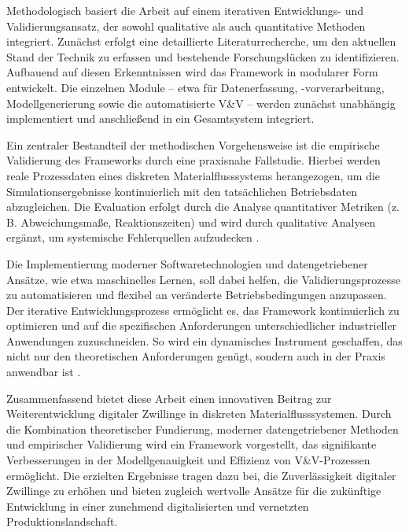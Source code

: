 Methodologisch basiert die Arbeit auf einem iterativen Entwicklungs- und Validierungsansatz, der sowohl qualitative als auch quantitative Methoden integriert. Zunächst erfolgt eine detaillierte Literaturrecherche, um den aktuellen Stand der Technik zu erfassen und bestehende Forschungslücken zu identifizieren. Aufbauend auf diesen Erkenntnissen wird das Framework in modularer Form entwickelt. Die einzelnen Module – etwa für Datenerfassung, -vorverarbeitung, Modellgenerierung sowie die automatisierte V\&V – werden zunächst unabhängig implementiert und anschließend in ein Gesamtsystem integriert.

Ein zentraler Bestandteil der methodischen Vorgehensweise ist die empirische Validierung des Frameworks durch eine praxisnahe Fallstudie. Hierbei werden reale Prozessdaten eines diskreten Materialflusssystems herangezogen, um die Simulationsergebnisse kontinuierlich mit den tatsächlichen Betriebsdaten abzugleichen. Die Evaluation erfolgt durch die Analyse quantitativer Metriken (z. B. Abweichungsmaße, Reaktionszeiten) und wird durch qualitative Analysen ergänzt, um systemische Fehlerquellen aufzudecken \parencite{Uhlemann2017}.

Die Implementierung moderner Softwaretechnologien und datengetriebener Ansätze, wie etwa maschinelles Lernen, soll dabei helfen, die Validierungsprozesse zu automatisieren und flexibel an veränderte Betriebsbedingungen anzupassen. Der iterative Entwicklungsprozess ermöglicht es, das Framework kontinuierlich zu optimieren und auf die spezifischen Anforderungen unterschiedlicher industrieller Anwendungen zuzuschneiden. So wird ein dynamisches Instrument geschaffen, das nicht nur den theoretischen Anforderungen genügt, sondern auch in der Praxis anwendbar ist \parencite{Tao2018, Kritzinger2018}.

Zusammenfassend bietet diese Arbeit einen innovativen Beitrag zur Weiterentwicklung digitaler Zwillinge in diskreten Materialflusssystemen. Durch die Kombination theoretischer Fundierung, moderner datengetriebener Methoden und empirischer Validierung wird ein Framework vorgestellt, das signifikante Verbesserungen in der Modellgenauigkeit und Effizienz von V\&V-Prozessen ermöglicht. Die erzielten Ergebnisse tragen dazu bei, die Zuverlässigkeit digitaler Zwillinge zu erhöhen und bieten zugleich wertvolle Ansätze für die zukünftige Entwicklung in einer zunehmend digitalisierten und vernetzten Produktionslandschaft.
